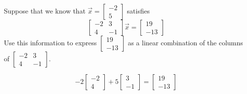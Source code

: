 \documentclass{ximera}
\begin{document}
\begin{example}\label{ex:linearcombofcols1}
Suppose that we know that $\vec{x}=\begin{bmatrix} -2\\5\end{bmatrix}$ satisfies
$$\begin{bmatrix}
-2&3\\
4&-1
\end{bmatrix}\vec{x}=\begin{bmatrix} 19\\-13\end{bmatrix}$$
Use this information to express $\begin{bmatrix} 19\\-13\end{bmatrix}$ as a linear combination of the columns of $\begin{bmatrix}
-2&3\\
4&-1
\end{bmatrix}$.
\begin{explanation}
$$-2\begin{bmatrix} -2\\4\end{bmatrix}+5\begin{bmatrix} 3\\-1\end{bmatrix}=\begin{bmatrix} 19\\-13\end{bmatrix}$$
\end{explanation}

\end{example}
\end{document}
